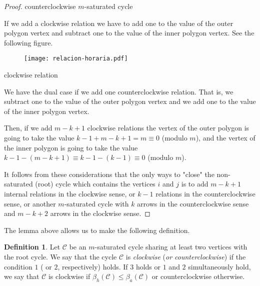\documentclass{amsart}
\theoremstyle{plain}
\theoremstyle{definition}
\newtheorem{defi}[teo]{Definition}
\begin{document}
\begin{proof}
\vspace{-.7cm} \hspace*{3.5cm}   counterclockwise $m$-saturated cycle

\vspace{.8cm}

If we add a clockwise  relation we have to add one to the  value of the outer polygon vertex and subtract one to the value of the inner polygon vertex. See the following figure.

 \begin{figure}[H]
 \begin{center}
 \texttt{[image: relacion-horaria.pdf]}
    
 \end{center}
 \end{figure}

\vspace{-.8cm} \hspace*{5cm}   clockwise relation

\vspace{.8cm}

 We have the dual case if we add one counterclockwise relation. That is, we subtract one to the value of the outer polygon vertex and we add one  to the value of the inner polygon vertex.

Then, if we add $m-k+1$ clockwise relations the vertex of the outer  polygon is going to take the value  $k-1+ m-k+1=m\equiv 0$ (modulo $m$), and  the vertex of the inner  polygon is going to take the value  $k-1- (m-k+1)\equiv k-1 -(k-1)\equiv 0$ (modulo $m$).

It follows from these considerations that the only ways to "close" the  non-saturated (root) cycle  which contains the vertices  $i$ and $j$ is to add $m-k+1$  internal relations in the clockwise sense, or $k-1$ relations in the counterclockwise sense, or another  $m$-saturated cycle with $k$ arrows in the counterclockwise sense and $m-k+2$ arrows in the clockwise sense.
\end{proof}

The lemma above allows us to make the following definition.

\begin{defi}
Let  $\mathcal{C}$ be an   $m$-saturated cycle sharing at least two vertices with the root cycle. We say that the  cycle $\mathcal{C}$ is  \textit{clockwise} (\textit{or counterclockwise}) if the  condition $1$ ( or $2$, respectively) holds.  If $3$ holds or  $1$ and $2$ simultaneously hold, we say that $\mathcal{C}$ is clockwise if $\beta_h(\mathcal{C})\leq \beta_a(\mathcal{C})$ or counterclockwise otherwise.
\end{defi}
\end{document}
